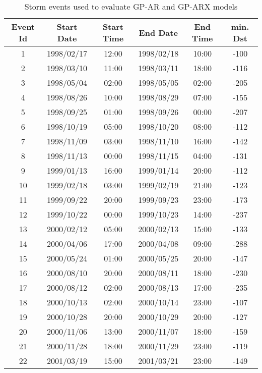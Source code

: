     

    \begin{table}[h]
    \fontsize{8}{9.6}\selectfont
    \centering
    \caption{Storm events used to evaluate GP-AR and GP-ARX models}
    \label{table:teststorms}
    \begin{tabular}{cccccc}
    \hline
    Event Id & Start Date & Start Time & End Date & End Time & min. Dst \\ \hline
    1 & 1998/02/17 & 12:00 & 1998/02/18 & 10:00 & -100 \\
    2 & 1998/03/10 & 11:00 & 1998/03/11 & 18:00 & -116 \\
    3 & 1998/05/04 & 02:00 & 1998/05/05 & 02:00 & -205 \\
    4 & 1998/08/26 & 10:00 & 1998/08/29 & 07:00 & -155 \\
    5 & 1998/09/25 & 01:00 & 1998/09/26 & 00:00 & -207 \\
    6 & 1998/10/19 & 05:00 & 1998/10/20 & 08:00 & -112 \\
    7 & 1998/11/09 & 03:00 & 1998/11/10 & 16:00 & -142 \\
    8 & 1998/11/13 & 00:00 & 1998/11/15 & 04:00 & -131 \\
    9 & 1999/01/13 & 16:00 & 1999/01/14 & 20:00 & -112 \\
    10 & 1999/02/18 & 03:00 & 1999/02/19 & 21:00 & -123 \\
    11 & 1999/09/22 & 20:00 & 1999/09/23 & 23:00 & -173 \\
    12 & 1999/10/22 & 00:00 & 1999/10/23 & 14:00 & -237 \\
    13 & 2000/02/12 & 05:00 & 2000/02/13 & 15:00 & -133 \\
    14 & 2000/04/06 & 17:00 & 2000/04/08 & 09:00 & -288 \\
    15 & 2000/05/24 & 01:00 & 2000/05/25 & 20:00 & -147 \\
    16 & 2000/08/10 & 20:00 & 2000/08/11 & 18:00 & -230 \\
    17 & 2000/08/12 & 02:00 & 2000/08/13 & 17:00 & -235 \\
    18 & 2000/10/13 & 02:00 & 2000/10/14 & 23:00 & -107 \\
    19 & 2000/10/28 & 20:00 & 2000/10/29 & 20:00 & -127 \\
    20 & 2000/11/06 & 13:00 & 2000/11/07 & 18:00 & -159 \\
    21 & 2000/11/28 & 18:00 & 2000/11/29 & 23:00 & -119 \\
    22 & 2001/03/19 & 15:00 & 2001/03/21 & 23:00 & -149 \\

\end{tabular}
\end{table}
